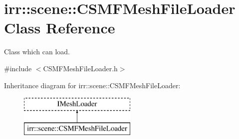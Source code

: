 \hypertarget{classirr_1_1scene_1_1_c_s_m_f_mesh_file_loader}{\section{irr\-:\-:scene\-:\-:C\-S\-M\-F\-Mesh\-File\-Loader Class Reference}
\label{classirr_1_1scene_1_1_c_s_m_f_mesh_file_loader}
}


Class which can load.  




{\ttfamily \#include $<$C\-S\-M\-F\-Mesh\-File\-Loader.\-h$>$}

Inheritance diagram for irr\-:\-:scene\-:\-:C\-S\-M\-F\-Mesh\-File\-Loader\-:\begin{figure}[H]
\begin{center}
\leavevmode
\includegraphics[height=2.000000cm]{classirr_1_1scene_1_1_c_s_m_f_mesh_file_loader}
\end{center}
\end{figure}
